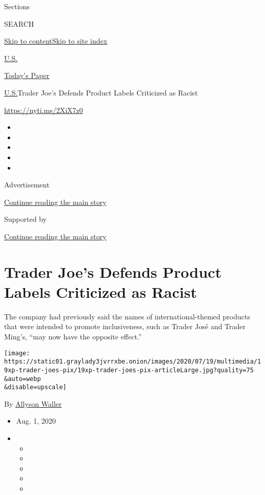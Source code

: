 Sections

SEARCH

\protect\hyperlink{site-content}{Skip to
content}\protect\hyperlink{site-index}{Skip to site index}

\href{https://www.nytimes3xbfgragh.onion/section/us}{U.S.}

\href{https://myaccount.nytimes3xbfgragh.onion/auth/login?response_type=cookie\&client_id=vi}{}

\href{https://www.nytimes3xbfgragh.onion/section/todayspaper}{Today's
Paper}

\href{/section/us}{U.S.}\textbar{}Trader Joe's Defends Product Labels
Criticized as Racist

\url{https://nyti.ms/2XiX7z0}

\begin{itemize}
\item
\item
\item
\item
\item
\end{itemize}

Advertisement

\protect\hyperlink{after-top}{Continue reading the main story}

Supported by

\protect\hyperlink{after-sponsor}{Continue reading the main story}

\hypertarget{trader-joes-defends-product-labels-criticized-as-racist}{%
\section{Trader Joe's Defends Product Labels Criticized as
Racist}\label{trader-joes-defends-product-labels-criticized-as-racist}}

The company had previously said the names of international-themed
products that were intended to promote inclusiveness, such as Trader
José and Trader Ming's, ``may now have the opposite effect.''

\texttt{[image: https://static01.graylady3jvrrxbe.onion/images/2020/07/19/multimedia/19xp-trader-joes-pix/19xp-trader-joes-pix-articleLarge.jpg?quality=75\\\&auto=webp\\\&disable=upscale]}

By \href{https://www.nytimes3xbfgragh.onion/by/allyson-waller}{Allyson
Waller}

\begin{itemize}
\item
  Aug. 1, 2020
\item
  \begin{itemize}
  \item
  \item
  \item
  \item
  \item
  \end{itemize}
\end{itemize}

